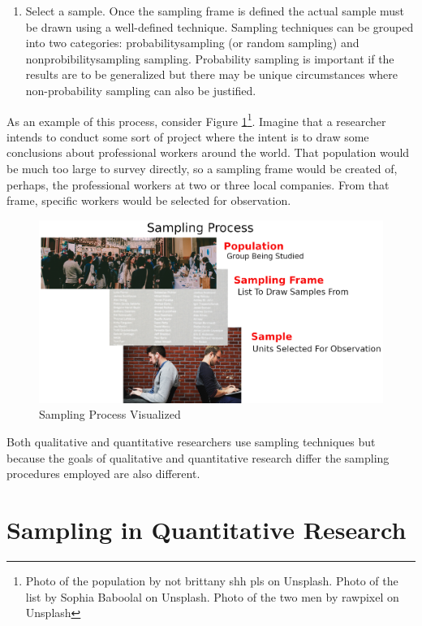 \begin{enumerate}
	\item Select a sample. Once the sampling frame is defined the actual sample must be drawn using a well-defined technique. Sampling techniques can be grouped into two categories: \gls{probabilitysampling} (or random sampling) and \gls{nonprobibilitysampling} sampling. Probability sampling is important if the results are to be generalized but there may be unique circumstances where non-probability sampling can also be justified.

\end{enumerate}

As an example of this process, consider Figure \ref{07:fig11}\footnote{Photo of the population by not brittany shh pls on Unsplash. Photo of the list by Sophia Baboolal on Unsplash. Photo of the two men by rawpixel on Unsplash}. Imagine that a researcher intends to conduct some sort of project where the intent is to draw some conclusions about professional workers around the world. That population would be much too large to survey directly, so a sampling frame would be created of, perhaps, the professional workers at two or three local companies. From that frame, specific workers would be selected for observation.

\begin{figure}[H]
	\centering
	\includegraphics[width=\maxwidth{.95\linewidth}]{gfx/07-11}
	\caption{Sampling Process Visualized}
	\label{07:fig11}
\end{figure}

Both qualitative and quantitative researchers use sampling techniques but because the goals of qualitative and quantitative research differ the sampling procedures employed are also different.

\section{Sampling in Quantitative Research}

